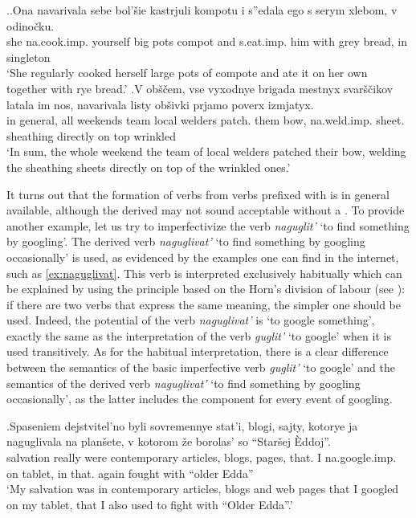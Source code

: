 \ex.\ag.\label{ex:navarivat2}Ona navarivala sebe bol'\v{s}ie kastrjuli kompotu i s''edala ego s serym xlebom, v odino\v{c}ku.\\
she na.cook.imp. yourself big pots compot and s.eat.imp. him with grey bread, in singleton\\
\trans `She regularly cooked herself large pots of compote and ate it on her own together with rye bread.'
\bg.\label{ex:navarivat1}V ob\v{s}\v{c}em, vse vyxodnye brigada mestnyx svar\v{s}\v{c}ikov latala im nos, navarivala listy ob\v{s}ivki prjamo poverx izmjatyx.\\
in general, all weekends team local welders patch. them bow, na.weld.imp. sheet. sheathing directly {on top} wrinkled\\
\trans `In sum, the whole weekend the team of local welders patched their bow, welding the sheathing sheets directly on top of the wrinkled ones.'

It turns out that the formation of  verbs from verbs prefixed with   is in general available, although the derived  may not sound acceptable without a . To provide another example, let us try to imperfectivize the verb \textit{naguglit'} `to find something by googling'. The derived verb \textit{naguglivat'} `to find something by googling occasionally' is used, as evidenced by the examples one can find in the internet, such as \ref{ex:naguglivat}. This verb is interpreted exclusively habitually which can be explained by using the principle based on the Horn's division of labour (see \citealt{Horn:84}): if there are two verbs that express the same meaning, the simpler one should be used. Indeed, the potential  of the verb \textit{naguglivat'} is `to google something', exactly the same as the interpretation of the verb \textit{guglit'} `to google' when it is used transitively. As for the habitual interpretation, there is a clear difference between the semantics of the basic imperfective verb \textit{guglit'} `to google' and the semantics of the derived  verb \textit{naguglivat'} `to find something by googling occasionally', as the latter includes the  component for every event of googling. 

\exg.\label{ex:naguglivat}Spaseniem dejstvitel'no byli sovremennye stat'i, blogi, sajty, kotorye ja naguglivala na plan\v{s}ete, v kotorom \v{z}e borolas' so ``Star\v{s}ej \`{E}ddoj''.\\
salvation really were contemporary articles, blogs, pages, that. I na.google.imp. on tablet, in that. again fought with ``older Edda''\\
\trans `My salvation was in contemporary articles, blogs and web pages that I googled on my tablet, that I also used to fight with ``Older Edda''.'\\

